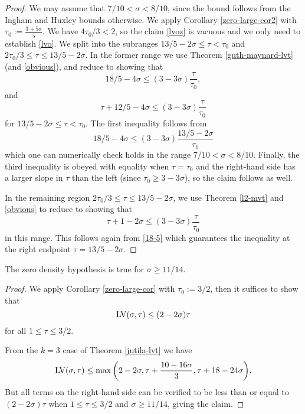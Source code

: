 \begin{proof} We may assume that $7/10 < \sigma < 8/10$, since the bound follows from the Ingham and Huxley bounds otherwise.  We apply Corollary \ref{zero-large-cor2} with $\tau_0 := \frac{3+5\sigma}{5}$.  We have $4\tau_0/3 < 2$, so the claim \eqref{lvoz} is vacuous and we only need to establish \eqref{lvo}.  We split into the subranges $13/5-2\sigma \leq \tau < \tau_0$ and $2\tau_0/3 \leq \tau \leq 13/5-2\sigma$. In the former range we use Theorem \ref{guth-maynard-lvt} (and \eqref{obvious}), and reduce to showing that
$$ 18/5 - 4 \sigma \leq (3-3\sigma) \frac{\tau}{\tau_0},$$
and
$$ \tau + 12/5 - 4\sigma \leq (3-3\sigma) \frac{\tau}{\tau_0}$$
for $13/5-2\sigma \leq \tau < \tau_0$.  The first inequality follows from
\begin{equation}\label{18-5}
 18/5 - 4 \sigma \leq (3-3\sigma) \frac{13/5-2\sigma}{\tau_0}
\end{equation}
which one can numerically check holds in the range $7/10 < \sigma < 8/10$.  Finally, the third inequality is obeyed with equality when $\tau=\tau_0$ and the right-hand side has a larger slope in $\tau$ than the left (since $\tau_0 \geq 3-3\sigma$), so the claim follows as well.

In the remaining region $2\tau_0/3 \leq \tau \leq 13/5-2\sigma$, we use Theorem \ref{l2-mvt} and \eqref{obvious} to reduce to showing that
$$ \tau + 1 - 2\sigma \leq (3-3\sigma) \frac{\tau}{\tau_0}$$
in this range.  This follows again from \eqref{18-5} which guarantees the inequality at the right endpoint $\tau = 13/5-2\sigma$.
\end{proof}

\begin{theorem}\label{jutila-density} \cite{jutila_zero_density_1977} The zero density hypothesis is true for $\sigma \geq 11/14$.
\end{theorem}
\derived
{}

\begin{proof}
We apply Corollary \ref{zero-large-cor} with $\tau_0 := 3/2$, then it suffices to show that
    $$\mathrm{LV}(\sigma,\tau) \leq (2-2\sigma) \tau$$
    for all $1 \leq \tau \leq 3/2$.

    From the $k=3$ case of Theorem \ref{jutila-lvt} we have
    $$\mathrm{LV}(\sigma,\tau) \leq \max \bigg(2-2\sigma, \tau + \frac{10-16\sigma}{3}, \tau + 18-24\sigma \bigg).$$
    But all terms on the right-hand side can be verified to be less than or equal to $(2-2\sigma)\tau$ when $1 \leq \tau \leq 3/2$ and $\sigma \geq 11/14$, giving the claim.
\end{proof}

